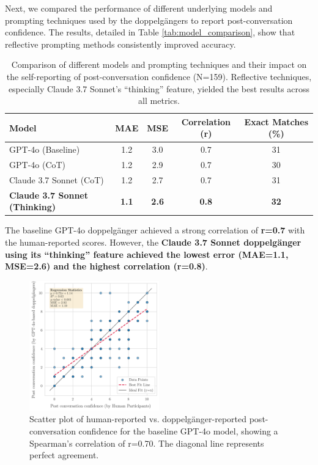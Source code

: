 Next, we compared the performance of different underlying models and prompting techniques used by the doppelgängers to report post-conversation confidence. The results, detailed in Table \ref{tab:model_comparison}, show that reflective prompting methods consistently improved accuracy.


\begin{table}[!ht]
\centering
\begin{tabular}{l|cccc}
\toprule
\textbf{Model} & \textbf{MAE} & \textbf{MSE} & \textbf{Correlation (r)} & \textbf{Exact Matches (\%)} \\
\midrule
GPT-4o (Baseline) & 1.2 & 3.0 & 0.7 & 31
\\
GPT-4o (CoT) & 1.2 & 2.9 & 0.7 & 30 \\
Claude 3.7 Sonnet (CoT) & 1.2 & 2.7 & 0.7 & 31 \\
\textbf{Claude 3.7 Sonnet (Thinking)} & \textbf{1.1} & \textbf{2.6} & \textbf{0.8} & \textbf{32} \\ 
\bottomrule
\end{tabular}
\caption[Model and Prompting Technique Comparison]{Comparison of different models and prompting techniques and their impact on the self-reporting of post-conversation confidence (N=159). Reflective techniques, especially Claude 3.7 Sonnet's ``thinking'' feature, yielded the best results across all metrics.}
\end{table}

The baseline GPT-4o doppelgänger achieved a strong correlation of \textbf{r=0.7} with the human-reported scores. However, the \textbf{Claude 3.7 Sonnet doppelgänger using its ``thinking'' feature achieved the lowest error (MAE=1.1, MSE=2.6) and the highest correlation (r=0.8)}.


\begin{figure}[htpb]
    \centering
    \includegraphics[width=0.5\textwidth]{fig/post_conf_gpt4o_vs_human.png}
    \caption{Scatter plot of human-reported vs. doppelgänger-reported post-conversation confidence for the baseline GPT-4o model, showing a Spearman's correlation of r=0.70. The diagonal line represents perfect agreement.}
    \label{fig:post-conf-gpt4o-vs-human}
\end{figure}


